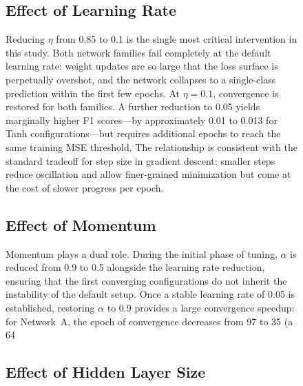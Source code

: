 \documentclass{acm_proc_article-sp} \usepackage{graphicx} \usepackage{amsmath} \usepackage{booktabs} \usepackage{url}
\begin{document}
\begin{figure}[ht]
{%

\subsection{Effect of Learning Rate}

Reducing $\eta$ from 0.85 to 0.1 is the single most critical intervention in this study. Both network families fail completely at the default learning rate: weight updates are so large that the loss surface is perpetually overshot, and the network collapses to a single-class prediction within the first few epochs. At $\eta = 0.1$, convergence is restored for both families. A further reduction to 0.05 yields marginally higher F1 scores---by approximately 0.01 to 0.013 for Tanh configurations---but requires additional epochs to reach the same training MSE threshold. The relationship is consistent with the standard tradeoff for step size in gradient descent: smaller steps reduce oscillation and allow finer-grained minimization but come at the cost of slower progress per epoch.

\subsection{Effect of Momentum}

Momentum plays a dual role. During the initial phase of tuning, $\alpha$ is reduced from 0.9 to 0.5 alongside the learning rate reduction, ensuring that the first converging configurations do not inherit the instability of the default setup. Once a stable learning rate of 0.05 is established, restoring $\alpha$ to 0.9 provides a large convergence speedup: for Network~A, the epoch of convergence decreases from 97 to 35 (a 64%

\subsection{Effect of Hidden Layer Size}

}
\end{figure}
\end{document}
